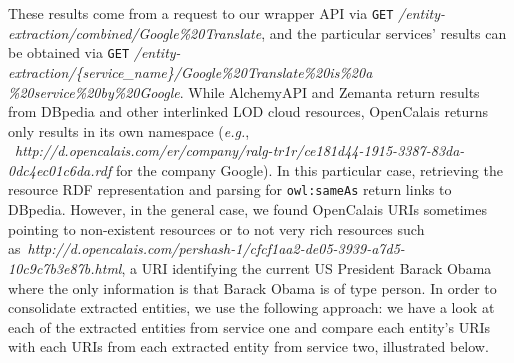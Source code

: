 \documentclass[twocolumn]{article}
\newcommand{\nofootnote}[1]{~#1}
\begin{document}
These results come from a request to our wrapper API via \texttt{GET} \textit{/entity-extraction/combined/Google\%20Translate},
and the particular services' results can be obtained via \texttt{GET} \textit{/entity-extraction/\{service\_name\}/Google\%20Translate\%20is\%20a\\\%20service\%20by\%20Google}.
While AlchemyAPI and Zemanta return results from DBpedia and other interlinked LOD cloud resources, OpenCalais returns
only results in its own namespace
(\emph{e.g.}, \nofootnote{\textit{http://d.opencalais.com/er/company/ralg-tr1r/ce181d44-1915-3387-83da-0dc4ec01c6da.rdf}} for the
company Google). In this particular case, retrieving the resource RDF representation and parsing for
\texttt{owl:sameAs} return links to DBpedia. However, in the general case, we found OpenCalais URIs sometimes pointing
to non-existent resources or to not very rich resources such
as\nofootnote{\textit{http://d.opencalais.com/pershash-1/cfcf1aa2-de05-3939-a7d5-10c9c7b3e87b.html}}, a URI identifying
the current US President Barack Obama where the only information is that Barack Obama is of type person. In order to
consolidate extracted entities, we use the following approach: we have a look at each of the extracted entities from
service one and compare each entity's URIs with each URIs from each extracted entity from service two, illustrated below.
\end{document}
